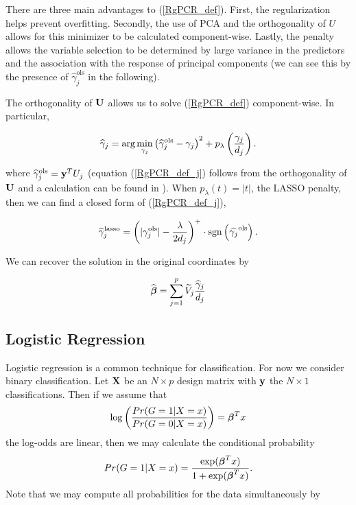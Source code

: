 \documentclass[main.tex]{subfiles}
\begin{document}
There are three main advantages to (\ref{RgPCR_def}). First, the regularization helps prevent overfitting. Secondly, the use of PCA and the orthogonality of $U$ allows for this minimizer to be calculated component-wise. Lastly, the penalty allows the variable selection to be determined by large variance in the predictors and the association with the response of principal components (we can see this by the presence of $\hat{\gamma}^{\text{ols}}_j$ in the following). 

The orthogonality of $\mathbf{U}$ allows us to solve (\ref{RgPCR_def}) component-wise. In particular,

\begin{align}
    \widehat{\gamma}_j = \text{arg} \min_{\gamma_j}  \left ( \widehat{\gamma}^{\text{ols}}_j - \gamma_j \right )^2 + p_\lambda \left ( \frac{\gamma_j}{d_j} \right ).  \label{RgPCR_def_j}
\end{align}

where $\widehat{\gamma}^{\text{ols}}_j = \mathbf{y}^T U_j$ (equation (\ref{RgPCR_def_j}) follows from the orthogonality of $\mathbf{U}$ and a calculation can be found in \cite{langzou}). When $p_{\lambda}(t) = |t|$, the LASSO penalty, then we can find a closed form of (\ref{RgPCR_def_j}),

\begin{align}
	\widehat{\gamma}_j^{\text{lasso}} = \left ( |\gamma_j^{\text{ols}}| - \frac{\lambda}{2d_j} \right )^+ \cdot \text{sgn} \left ( \widehat{\gamma_j}^{\text{ols}} \right ).
\end{align}

We can recover the solution in the original coordinates by

\begin{align}
	\widehat{\boldsymbol \beta} = \sum_{j = 1}^p \widetilde{V}_j \frac{\widehat{\gamma}_j}{d_j}
\end{align}

\subsection{Logistic Regression}
Logistic regression is a common technique for classification. For now we consider binary classification. Let $\mathbf{X}$ be an $N \times p$ design matrix with $\mathbf{y}$ the $N \times 1$ classifications. Then if we assume that
\begin{align}
    \log \left ( \dfrac{Pr(G = 1 | X = x)}{Pr(G = 0|X = x)}\right ) = \boldsymbol \beta^Tx \label{log-odds}
\end{align}
the log-odds are linear, then we may calculate the conditional probability
\begin{align}
    Pr(G = 1 | X = x) = \dfrac{\text{exp}(\boldsymbol \beta^Tx)}{1 + \text{exp}(\boldsymbol \beta^Tx)}.
\end{align}
Note that we may compute all probabilities for the data simultaneously by
\end{document}
